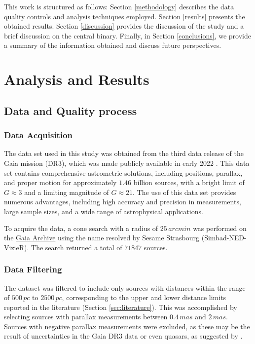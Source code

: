 \documentclass[baaa]{baaa}
\begin{document}
This work is structured as follows: Section \ref{methodology} describes the data quality controls and analysis techniques employed. Section \ref{results} presents the obtained results. Section \ref{discussion} provides the discussion of the study and a brief discussion on the central binary. Finally, in Section \ref{conclusions}, we provide a summary of the information obtained and discuss future perspectives.

\section{Analysis and Results}
\subsection{Data and Quality process}
\subsubsection{Data Acquisition}

The data set used in this study was obtained from the third data release of the Gaia mission (DR3), which was made publicly available in early 2022 \citep{2016A&A...595A...1G,2022arXiv220800211G}. This data set contains comprehensive astrometric solutions, including positions, parallax, and proper motion for approximately $1.46$ billion sources, with a bright limit of $G \approx 3$ and a limiting magnitude of $G \approx 21$. The use of this data set provides numerous advantages, including high accuracy and precision in measurements, large sample sizes, and a wide range of astrophysical applications.

To acquire the data, a cone search with a radius of $25\,arcmin$ was performed on the \href{https://gea.esac.esa.int/archive/}{Gaia Archive} using the name resolved by Sesame Strasbourg (Simbad-NED-VizieR). The search returned a total of $71847$ sources.

\subsubsection{Data Filtering}

The dataset was filtered to include only sources with distances within the range of $500\,pc$ to $2500\,pc$, corresponding to the upper and lower distance limits reported in the literature (Section \ref{sec:literature}). This was accomplished by selecting sources with parallax measurements between $0.4\,mas$ and $2\,mas$. Sources with negative parallax measurements were excluded, as these may be the result of uncertainties in the Gaia DR3 data or even quasars, as suggested by \citet{2018A&A...616A...9L}.
\end{document}
